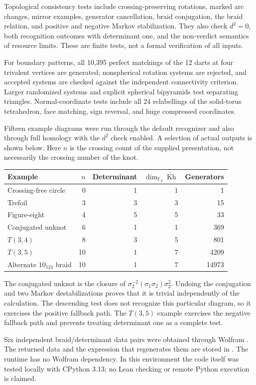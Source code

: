 \documentclass[11pt]{article}
\theoremstyle{remark}\newtheorem{remark}[theorem]{Remark}
\newcommand{\F}{\mathbb F_2}
\newcommand{\Kh}{\widetilde{\operatorname{Kh}}}
\newcommand{\code}[1]{\texttt{\detokenize{#1}}}
\begin{document}
Topological consistency tests include crossing-preserving rotations, marked
arc changes, mirror examples, generator cancellation, braid conjugation, the
braid relation, and positive and negative Markov stabilization. They also
check $d^2=0$, both recognition outcomes with determinant one, and the
non-verdict semantics of resource limits. These are finite tests, not a formal
verification of all inputs.

For boundary patterns, all 10,395 perfect matchings of the 12 darts at four
trivalent vertices are generated; nonspherical rotation systems are rejected,
and accepted systems are checked against the independent connectivity
criterion. Larger randomized systems and explicit spherical bipyramids test
separating triangles. Normal-coordinate tests include all 24 relabellings of
the solid-torus tetrahedron, face matching, sign reversal, and huge compressed
coordinates.

Fifteen example diagrams were run through the default recognizer and also
through full homology with the $d^2$ check enabled. A selection of actual
outputs is shown below. Here $n$ is the crossing count of the supplied
presentation, not necessarily the crossing number of the knot.
\begin{center}
\begin{tabular}{@{}lrrrr@{}}
\toprule
Example & $n$ & Determinant & $\dim_{\F}\Kh$ & Generators\\
\midrule
Crossing-free circle & 0 & 1 & 1 & 1\\
Trefoil & 3 & 3 & 3 & 15\\
Figure-eight & 4 & 5 & 5 & 33\\
Conjugated unknot & 6 & 1 & 1 & 369\\
$T(3,4)$ & 8 & 3 & 5 & 801\\
$T(3,5)$ & 10 & 1 & 7 & 4209\\
Alternate $10_{124}$ braid & 10 & 1 & 7 & 14973\\
\bottomrule
\end{tabular}
\end{center}
The conjugated unknot is the closure of
$\sigma_2^{-2}(\sigma_1\sigma_2)\sigma_2^2$. Undoing the conjugation and two
Markov destabilizations proves that it is trivial independently of the
calculation. The descending test does not recognize this particular diagram,
so it exercises the positive fallback path. The $T(3,5)$ example exercises
the negative fallback path and prevents treating determinant one as a
complete test.

Six independent braid/determinant data pairs were obtained through Wolfram
\code{KnotData} \cite{wolfram}. The returned data and the expression that
regenerates them are stored in \code{results/}. The runtime has no Wolfram
dependency. In this environment the code itself was tested locally with
CPython 3.13; no Lean checking or remote Python execution is claimed.
\end{document}
